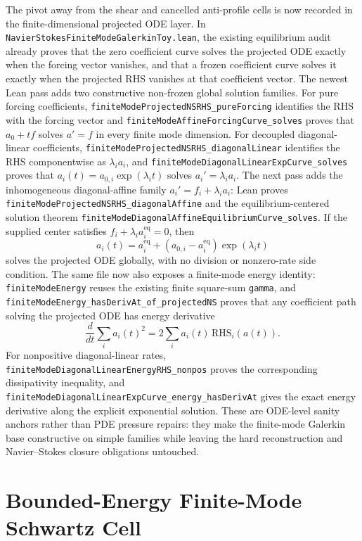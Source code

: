 \documentclass[11pt]{article}
\begin{document}
The pivot away from the shear and cancelled anti-profile cells is now recorded
in the finite-dimensional projected ODE layer.  In
\texttt{NavierStokesFiniteModeGalerkinToy.lean}, the existing equilibrium audit
already proves that the zero coefficient curve solves the projected ODE exactly
when the forcing vector vanishes, and that a frozen coefficient curve solves it
exactly when the projected RHS vanishes at that coefficient vector.  The newest
Lean pass adds two constructive non-frozen global solution families.  For pure
forcing coefficients, \texttt{finiteModeProjectedNSRHS\_pureForcing} identifies
the RHS with the forcing vector and
\texttt{finiteModeAffineForcingCurve\_solves} proves that \(a_0+t f\) solves
\(a'=f\) in every finite mode dimension.  For decoupled diagonal-linear
coefficients, \texttt{finiteModeProjectedNSRHS\_diagonalLinear} identifies the
RHS componentwise as \(\lambda_i a_i\), and
\texttt{finiteModeDiagonalLinearExpCurve\_solves} proves that
\(a_i(t)=a_{0,i}\exp(\lambda_i t)\) solves \(a_i'=\lambda_i a_i\).  The next
pass adds the inhomogeneous diagonal-affine family
\(a_i'=f_i+\lambda_i a_i\): Lean proves
\texttt{finiteModeProjectedNSRHS\_diagonalAffine} and the
equilibrium-centered solution theorem
\texttt{finiteModeDiagonalAffineEquilibriumCurve\_solves}.  If the supplied
center satisfies \(f_i+\lambda_i a^{\mathrm{eq}}_i=0\), then
\[
  a_i(t)=a^{\mathrm{eq}}_i+
    (a_{0,i}-a^{\mathrm{eq}}_i)\exp(\lambda_i t)
\]
solves the projected ODE globally, with no division or nonzero-rate side
condition.  The same file now also exposes a finite-mode energy identity:
\texttt{finiteModeEnergy} reuses the existing finite square-sum
\texttt{gamma}, and
\texttt{finiteModeEnergy\_hasDerivAt\_of\_projectedNS} proves that any
coefficient path solving the projected ODE has energy derivative
\[
  \frac{d}{dt}\sum_i a_i(t)^2 =
    2\sum_i a_i(t)\,\mathrm{RHS}_i(a(t)).
\]
For nonpositive diagonal-linear rates,
\texttt{finiteModeDiagonalLinearEnergyRHS\_nonpos} proves the corresponding
dissipativity inequality, and
\texttt{finiteModeDiagonalLinearExpCurve\_energy\_hasDerivAt} gives the exact
energy derivative along the explicit exponential solution.  These are
ODE-level sanity anchors rather than PDE pressure repairs: they make the
finite-mode Galerkin base constructive on simple families while leaving the
hard reconstruction and Navier--Stokes closure obligations untouched.

\section{Bounded-Energy Finite-Mode Schwartz Cell}
\end{document}
